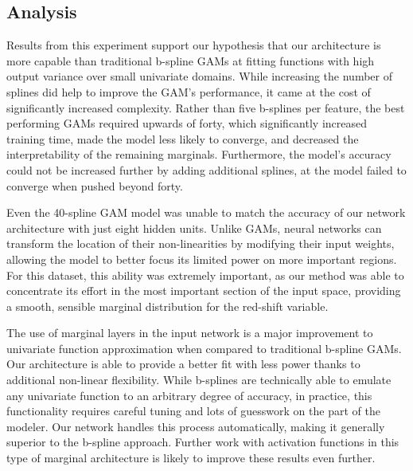 \subsection{Analysis}

Results from this experiment support our hypothesis that our architecture is more capable than traditional b-spline GAMs at fitting functions with high output variance over small univariate domains. While increasing the number of splines did help to improve the GAM's performance, it came at the cost of significantly increased complexity. Rather than five b-splines per feature, the best performing GAMs required upwards of forty, which significantly increased training time, made the model less likely to converge, and decreased the interpretability of the remaining marginals. Furthermore, the model's accuracy could not be increased further by adding additional splines, at the model failed to converge when pushed beyond forty. 

Even the 40-spline GAM model was unable to match the accuracy of our network architecture with just eight hidden units. Unlike GAMs, neural networks can transform the location of their non-linearities by modifying their input weights, allowing the model to better focus its limited power on more important regions. For this dataset, this ability was extremely important, as our method was able to concentrate its effort in the most important section of the input space, providing a smooth, sensible marginal distribution for the red-shift variable.

The use of marginal layers in the input network is a major improvement to univariate function approximation when compared to traditional b-spline GAMs. Our architecture is able to provide a better fit with less power thanks to additional non-linear flexibility. While b-splines are technically able to emulate any univariate function to an arbitrary degree of accuracy, in practice, this functionality requires careful tuning and lots of guesswork on the part of the modeler. Our network handles this process automatically, making it generally superior to the b-spline approach. Further work with activation functions in this type of marginal architecture is likely to improve these results even further. 

